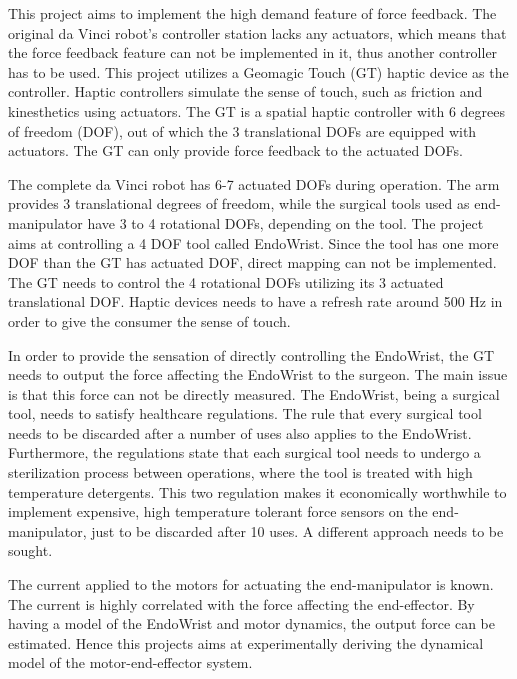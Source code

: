 This project aims to implement the high demand feature of force feedback. The original da Vinci robot's controller station lacks any actuators, which means that the force feedback feature can not be implemented in it, thus another controller has to be used. This project utilizes a Geomagic Touch (GT) haptic device as the controller. Haptic controllers simulate the sense of touch, such as friction and kinesthetics using actuators.
The GT is a spatial haptic controller with 6 degrees of freedom (DOF), out of which the 3 translational DOFs are equipped with actuators. The GT can only provide force feedback to the actuated DOFs.

The complete da Vinci robot has 6-7 actuated DOFs during operation. The arm provides 3 translational degrees of freedom, while the surgical tools used as end-manipulator have 3 to 4 rotational DOFs, depending on the tool. The project aims at controlling a 4 DOF tool called EndoWrist. Since the tool has one more DOF than the GT has actuated DOF, direct mapping can not be implemented. The GT needs to control the 4 rotational DOFs utilizing its 3 actuated translational DOF. Haptic devices needs to have a refresh rate around 500 Hz in order to give the consumer the sense of touch.%

In order to provide the sensation of directly controlling the EndoWrist, the GT needs to output the force affecting the EndoWrist to the surgeon. The main issue is that this force can not be directly measured. The EndoWrist, being a surgical tool, needs to satisfy healthcare regulations. The rule that every surgical tool needs to be discarded after a number of uses also applies to the EndoWrist. Furthermore, the regulations state that each surgical tool needs to undergo a sterilization process between operations, where the tool is treated with high temperature detergents. This two regulation makes it economically worthwhile to implement expensive, high temperature tolerant force sensors on the end-manipulator, just to be discarded after 10 uses. A different approach needs to be sought.

The current applied to the motors for actuating the end-manipulator is known. The current is highly correlated with the force affecting the end-effector. By having a model of the EndoWrist and motor dynamics, the output force can be estimated. Hence this projects aims at experimentally deriving the dynamical model of the motor-end-effector system.

